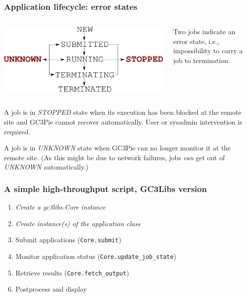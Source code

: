 \documentclass[english,serif,mathserif,xcolor=pdftex,dvipsnames,table]{beamer}
\begin{document}
\begin{frame}[fragile]
\frametitle{Application lifecycle: error states}
\begin{columns}[c]
  \begin{column}{0.5\textwidth}
    \includegraphics[width=\textwidth]{fig/states-error}
  \end{column}
  \begin{column}{0.5\textwidth}
    \raggedleft

    Two jobs indicate an error state, i.e., impossibility to carry a
    job to termination.
  \end{column}
\end{columns}

\+
A job is in \emph{STOPPED} state when its execution has been
blocked at the remote site and GC3Pie cannot recover
automatically.  User or sysadmin intervention is required.

\+
A job is in \emph{UNKNOWN} state when GC3Pie can no longer
monitor it at the remote site. (As this might be due to network
failures, jobs \emph{can} get out of \emph{UNKNOWN}
automatically.)
\end{frame}


\begin{frame}
\frametitle{A simple high-throughput script, GC3Libs version}

\begin{enumerate}
\item \emph{Create a gc3libs.Core instance}
\item \emph{Create instance(s) of the application class}
\item Submit applications (\texttt{Core.submit})
\item Monitor application status (\texttt{Core.update\_job\_state})
\item Retrieve results (\texttt{Core.fetch\_output})
\item Postprocess and display
\end{enumerate}
\end{frame}
\end{document}
